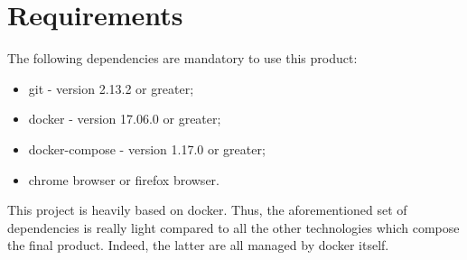 \section{Requirements}

The following dependencies are mandatory to use this product:
\begin{itemize}
   \item git - version 2.13.2 or greater;
   \item docker - version 17.06.0 or greater;
   \item docker-compose - version 1.17.0 or greater;
   \item chrome browser or firefox browser.
\end{itemize}

This project is heavily based on docker. Thus, the aforementioned
set of dependencies is really light compared to all the other
technologies which compose the final product.
Indeed, the latter are all managed by docker itself.